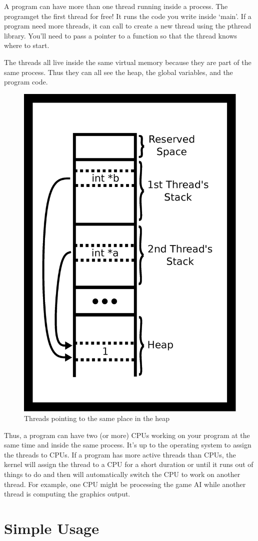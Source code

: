 A program can have more than one thread running inside a process.
The programget the first thread for free!
It runs the code you write inside `main'.
If a program need more threads, it can call  to create a new thread using the pthread library.
You'll need to pass a pointer to a function so that the thread knows where to start.

The threads all live inside the same virtual memory because they are part of the same process.
Thus they can all see the heap, the global variables, and the program code.

\begin{figure}[H]
\centering
\includegraphics[width=.5\textwidth]{threads/drawings/thread_stack_pointer.eps}
\caption{Threads pointing to the same place in the heap}
\end{figure}

Thus, a program can have two (or more) CPUs working on your program at the same time and inside the same process.
It's up to the operating system to assign the threads to CPUs.
If a program has more active threads than CPUs, the kernel will assign the thread to a CPU for a short duration or until it runs out of things to do and then will automatically switch the CPU to work on another thread.
For example, one CPU might be processing the game AI while another thread is computing the graphics output.

\section{Simple Usage}

